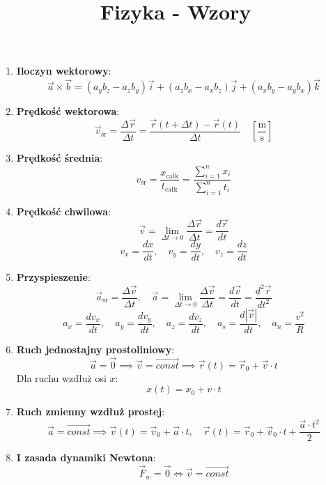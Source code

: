 \documentclass{article}
\author{}
\title{Fizyka - Wzory}
\date{}
\begin{document}
	\maketitle
	
	\begin{enumerate}
		
		\item \textbf{Iloczyn wektorowy}:
		\[
		\vec{a} \times \vec{b} = (a_yb_z - a_zb_y)\vec{i} + (a_zb_x - a_xb_z)\vec{j} + (a_xb_y - a_yb_x)\vec{k}
		\]
		
		\item \textbf{Prędkość wektorowa}:
		\[
		\vec{v}_\text{śr} = \frac{\Delta\vec{r}}{\Delta t} = \frac{\vec{r}(t + \Delta t) - \vec{r}(t)}{\Delta t} \quad \left[\frac{\text{m}}{\text{s}}\right]
		\]
		
		\item \textbf{Prędkość średnia}:
		\[
		v_\text{śr} = \frac{x_\text{całk}}{t_\text{całk}} = \frac{\sum \limits_{i=1}^{n}x_i}{\sum \limits_{i=1}^{n}t_i}
		\]
		
		\item \textbf{Prędkość chwilowa}:
		\[
		\vec{v} = \lim_{\Delta t \to 0} \frac{\Delta \vec{r}}{\Delta t} = \frac{d \vec{r}}{dt}
		\]
		\[
		v_x = \frac{dx}{dt}, \quad v_y = \frac{dy}{dt}, \quad v_z = \frac{dz}{dt}
		\]
		
		\item \textbf{Przyspieszenie}:
		\[
		\vec{a}_\text{śr} = \frac{\Delta \vec{v}}{\Delta t}, \quad 
		\vec{a} = \lim_{\Delta t \to 0} \frac{\Delta \vec{v}}{\Delta t} = \frac{d \vec{v}}{dt} = \frac{d^2 \vec{r}}{dt^2}
		\]
		\[
		a_x = \frac{dv_x}{dt}, \quad a_y = \frac{dv_y}{dt}, \quad a_z = \frac{dv_z}{dt}, \quad a_s = \frac{d|\vec{v}|}{dt}, \quad a_n = \frac{v^2}{R}
		\]
		
		\item \textbf{Ruch jednostajny prostoliniowy}:
		\[
		\vec{a} = \vec{0} \implies \vec{v} = \overrightarrow{const} \implies \vec{r}(t) = \vec{r}_0 + \vec{v} \cdot t
		\]
		Dla ruchu wzdłuż osi \(x\):
		\[
		x(t) = x_0 + v \cdot t
		\]
		
		\item \textbf{Ruch zmienny wzdłuż prostej}:
		\[
		\vec{a} = \overrightarrow{const} \implies \vec{v}(t) = \vec{v}_0 + \vec{a} \cdot t, \quad \vec{r}(t) = \vec{r}_0 + \vec{v}_0 \cdot t + \frac{\vec{a} \cdot t^2}{2}
		\]
		
		\item \textbf{I zasada dynamiki Newtona}:
		\[
		\vec{F}_w = \vec{0} \iff \vec{v} = \overrightarrow{const}
		\]
		

\end{enumerate}
\end{document}
